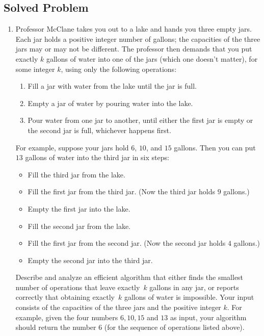 \documentclass[11pt]{article}
\begin{document}
\subsection*{Solved Problem}


\begin{enumerate}\parindent 1.5em
\setcounter{enumi}{3}

\item

Professor McClane takes you out to a lake and hands you three empty jars.  Each jar holds a positive integer number of gallons; the capacities of the three jars may or may not be different.  The professor then demands that you put exactly $k$ gallons of water into one of the jars (which one doesn’t matter), for some integer $k$, using only the following operations:
\begin{enumerate}
\item Fill a jar with water from the lake until the jar is full.
\item Empty a jar of water by pouring water into the lake.
\item Pour water from one jar to another, until either the first jar is empty or the second jar is full, whichever happens first. 
\end{enumerate}
For example, suppose your jars hold $6$, $10$, and $15$ gallons.  Then you can put $13$ gallons of water into the third jar in six steps:
\begin{itemize}\itemsep0pt
\item Fill the third jar from the lake.
\item Fill the first jar from the third jar.  (Now the third jar holds $9$ gallons.)
\item Empty the first jar into the lake.
\item Fill the second jar from the lake.
\item Fill the first jar from the second jar.  (Now the second jar holds $4$ gallons.)
\item Empty the second jar into the third jar.
\end{itemize}

Describe and analyze an efficient algorithm that either finds the smallest number of operations that leave exactly~$k$ gallons in any jar, or reports correctly that obtaining exactly~$k$ gallons of water is impossible.  Your input consists of the capacities of the three jars and the positive integer $k$.  For example, given the four numbers $6, 10, 15$ and $13$ as input, your algorithm should return the number $6$ (for the sequence of operations listed above).



\end{enumerate}
\end{document}
